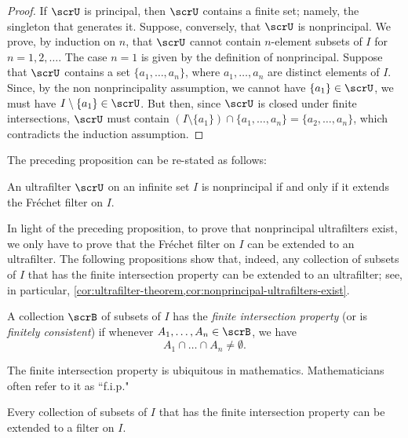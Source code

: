 \begin{proof}
  If $\scrU$ is principal, then $\scrU$ contains a finite set;
  namely, the singleton that generates it.
  Suppose, conversely, that $\scrU$ is nonprincipal.
  We prove, by induction on $n$, that $\scrU$ cannot contain $n$-element subsets of $I$ for $n=1, 2,\dots$.
  The case $n=1$ is given by the definition of nonprincipal.
  Suppose that $\scrU$ contains a set $\{a_1,\dots, a_n\}$, where $a_1,\dots, a_n$ are distinct elements of $I$.
  Since, by the non nonprincipality assumption, we cannot have $\{a_1\}\in \scrU$, we must have $I\setminus \{a_1\}\in \scrU$.
  But then, since $\scrU$ is closed under finite intersections, $\scrU$ must contain $(I\setminus \{a_1\})\cap\{a_1,\dots, a_n\}=\{a_2,\dots, a_n\}$, which contradicts the induction assumption.
\end{proof}

The preceding proposition can be re-stated as follows:

\begin{proposition}
  \label{prop:nonprincipality-and-frechet}
  An ultrafilter $\scrU$ on an infinite set $I$ is nonprincipal if and only if it extends the Fréchet filter on $I$.
\end{proposition}

In light of the preceding proposition, to prove that nonprincipal ultrafilters exist, we only have to prove that the Fréchet filter on $I$ can be extended to an ultrafilter.
The following propositions show that, indeed,  any collection of subsets of $I$ that has the finite intersection property can be extended to an ultrafilter;
see, in particular, \cref{cor:ultrafilter-theorem,cor:nonprincipal-ultrafilters-exist}.

\begin{definition}
  \label{def:fip}
  A collection $\scrB$ of subsets of $I$ has the \emph{finite intersection property} (or is \emph{finitely consistent}) if whenever $A_1,\dots, A_n\in\scrB$, we have
  \[
    A_1\cap\dots\cap A_n\neq \emptyset \text{.}
  \]
\end{definition}

The finite intersection property is ubiquitous in mathematics.
Mathematicians often refer to it as “f.i.p."

\begin{proposition}
  \label{prop:filter-generated-by-a-base}
  Every collection of subsets of $I$ that has the finite intersection property can be extended to a filter on $I$.
\end{proposition}


